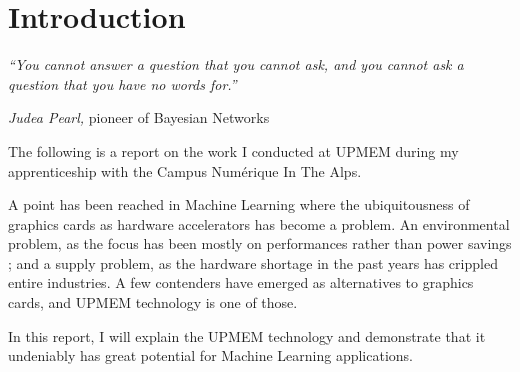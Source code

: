 \chapter{Introduction}
\label{chapter:introduction}

\epigraph{\large\textit{``You cannot answer a question that you cannot ask, and you cannot ask a question that you have no words for.''}}{\textit{Judea Pearl,} pioneer of Bayesian Networks}

The following is a report on the work I conducted at UPMEM during my apprenticeship with the Campus Numérique In The Alps.

\bigskip

A point has been reached in Machine Learning where the ubiquitousness of graphics cards as hardware accelerators has become a problem. An environmental problem, as the focus has been mostly on performances rather than power savings ; and a supply problem, as the hardware shortage in the past years has crippled entire industries. A few contenders have emerged as alternatives to graphics cards, and UPMEM technology is one of those.

In this report, I will explain the UPMEM technology and demonstrate that it undeniably has great potential for Machine Learning applications.